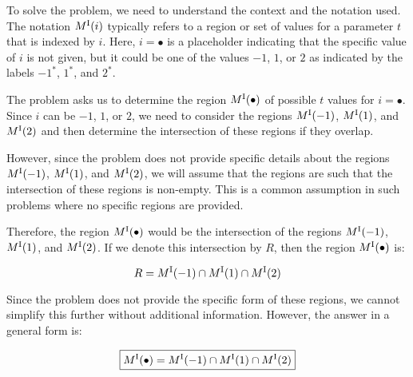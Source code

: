 To solve the problem, we need to understand the context and the notation used. The notation \( M^{\rm I}(i) \) typically refers to a region or set of values for a parameter \( t \) that is indexed by \( i \). Here, \( i = \bullet \) is a placeholder indicating that the specific value of \( i \) is not given, but it could be one of the values \(-1\), \(1\), or \(2\) as indicated by the labels \(-1^*\), \(1^*\), and \(2^*\).

The problem asks us to determine the region \( M^{\rm I}(\bullet) \) of possible \( t \) values for \( i = \bullet \). Since \( i \) can be \(-1\), \(1\), or \(2\), we need to consider the regions \( M^{\rm I}(-1)\), \( M^{\rm I}(1)\), and \( M^{\rm I}(2)\) and then determine the intersection of these regions if they overlap.

However, since the problem does not provide specific details about the regions \( M^{\rm I}(-1)\), \( M^{\rm I}(1)\), and \( M^{\rm I}(2)\), we will assume that the regions are such that the intersection of these regions is non-empty. This is a common assumption in such problems where no specific regions are provided.

Therefore, the region \( M^{\rm I}(\bullet) \) would be the intersection of the regions \( M^{\rm I}(-1)\), \( M^{\rm I}(1)\), and \( M^{\rm I}(2)\). If we denote this intersection by \( R \), then the region \( M^{\rm I}(\bullet) \) is:

\[
R = M^{\rm I}(-1) \cap M^{\rm I}(1) \cap M^{\rm I}(2)
\]

Since the problem does not provide the specific form of these regions, we cannot simplify this further without additional information. However, the answer in a general form is:

\[
\boxed{M^{\rm I}(\bullet) = M^{\rm I}(-1) \cap M^{\rm I}(1) \cap M^{\rm I}(2)}
\]